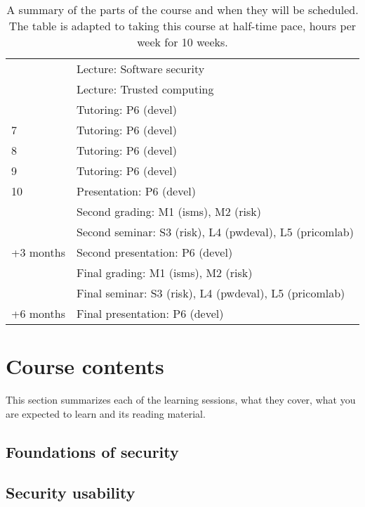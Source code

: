\begin{table}
\begin{tabular}{lp{9cm}}
      & Lecture: Software security\\
      & Lecture: Trusted computing\\
      & Tutoring: P6 (devel)\\
    \midrule
    7
      & Tutoring: P6 (devel)\\
    \midrule
    8
      & Tutoring: P6 (devel)\\
    \midrule
    9
      & Tutoring: P6 (devel)\\
    \midrule
    10
      & Presentation: P6 (devel)\\
      & Second grading: M1 (isms), M2 (risk)\\
      & Second seminar: S3 (risk), L4 (pwdeval), L5 (pricomlab)\\
    \midrule
    +3 months
      & Second presentation: P6 (devel)\\
      & Final grading: M1 (isms), M2 (risk)\\
      & Final seminar: S3 (risk), L4 (pwdeval), L5 (pricomlab)\\
    \midrule
    +6 months
      & Final presentation: P6 (devel)\\
    \bottomrule
  \end{tabular}
  \caption{%
    A summary of the parts of the course and when they will be scheduled.
    The table is adapted to taking this course at half-time pace,  
    hours per week for 10 weeks.
  }\label{Schedule}
\end{table}


\section{Course contents}%
\label{CourseContents}

This section summarizes each of the learning sessions, \ie what they cover, 
what you are expected to learn and its reading material.

%
%
\subsection{Foundations of security}


\subsection{Security usability}


